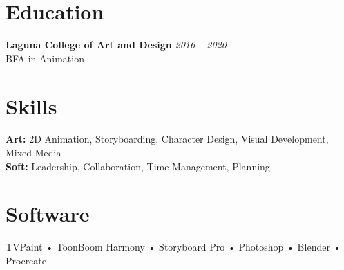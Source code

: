 \documentclass[11pt,letterpaper]{article}
\begin{document}
\section{Education}

\textbf{Laguna College of Art and Design} \hfill \textit{2016 -- 2020}\\
BFA in Animation

\section{Skills}

\textbf{Art:} 2D Animation, Storyboarding, Character Design, Visual Development, Mixed Media \\ 
\textbf{Soft:} Leadership, Collaboration, Time Management, Planning

\section{Software}

TVPaint • ToonBoom Harmony • Storyboard Pro • Photoshop • Blender • Procreate
\end{document}

